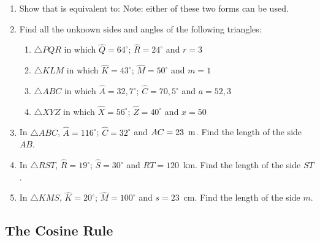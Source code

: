 {
\begin{enumerate}
\item Show that
is equivalent to:
Note: either of these two forms can be used.
\item Find all the unknown sides and angles of the following triangles:
	\begin{enumerate}
	\item $\triangle PQR$ in which $\hat{Q} = 64^\circ$; $\hat{R} = 24^\circ$ and $r=3$
	\item $\triangle KLM$ in which $\hat{K} = 43^\circ$; $\hat{M} = 50^\circ$ and $m=1$
	\item $\triangle ABC$ in which $\hat{A} = 32,7^\circ$; $\hat{C} = 70,5^\circ$ and $a=52,3$
	\item $\triangle XYZ$ in which $\hat{X} = 56^\circ$; $\hat{Z} = 40^\circ$ and $x=50$
	\end{enumerate}
\item In $\triangle ABC$, $\hat{A} = 116^\circ$;  $\hat{C} = 32^\circ$ and $AC = 23~\,\rm{m}$. Find the length of the side $AB$.
\item In $\triangle RST$, $\hat{R} = 19^\circ$;  $\hat{S} = 30^\circ$ and $RT = 120$~km. Find the length of the side $ST$.
\item In $\triangle KMS$, $\hat{K} = 20^\circ$;  $\hat{M} = 100^\circ$ and $s = 23$~cm. Find the length of the side $m$.
\end{enumerate}
}

\subsection{The Cosine Rule}


